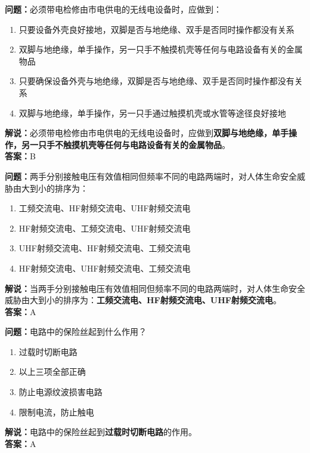 \bigskip



\noindent\textbf{问题：}必须带电检修由市电供电的无线电设备时，应做到：
\begin{enumerate}[label=\Alph*), leftmargin=3em]
	\item 只要设备外壳良好接地，双脚是否与地绝缘、双手是否同时操作都没有关系
	\item 双脚与地绝缘，单手操作，另一只手不触摸机壳等任何与电路设备有关的金属物品
	\item 只要确保设备外壳与地绝缘，双脚是否与地绝缘、双手是否同时操作都没有关系
	\item 双脚与地绝缘，单手操作，另一只手通过触摸机壳或水管等途径良好接地
\end{enumerate}
\noindent\textbf{解说：}必须带电检修由市电供电的无线电设备时，应做到\textbf{双脚与地绝缘，单手操作，另一只手不触摸机壳等任何与电路设备有关的金属物品}。\\\noindent\textbf{答案：}B


\bigskip



\noindent\textbf{问题：}两手分别接触电压有效值相同但频率不同的电路两端时，对人体生命安全威胁由大到小的排序为：
\begin{enumerate}[label=\Alph*), leftmargin=3em]
	\item 工频交流电、HF射频交流电、UHF射频交流电
	\item HF射频交流电、工频交流电、UHF射频交流电
	\item UHF射频交流电、HF射频交流电、工频交流电
	\item HF射频交流电、UHF射频交流电、工频交流电
\end{enumerate}
\noindent\textbf{解说：}当两手分别接触电压有效值相同但频率不同的电路两端时，对人体生命安全威胁由大到小的排序为：\textbf{工频交流电、HF射频交流电、UHF射频交流电}。\\\noindent\textbf{答案：}A


\bigskip



\noindent\textbf{问题：}电路中的保险丝起到什么作用？
\begin{enumerate}[label=\Alph*), leftmargin=3em]
	\item 过载时切断电路
	\item 以上三项全部正确
	\item 防止电源纹波损害电路
	\item 限制电流，防止触电
\end{enumerate}
\noindent\textbf{解说：}电路中的保险丝起到\textbf{过载时切断电路}的作用。\\\noindent\textbf{答案：}A


